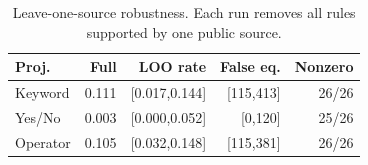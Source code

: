 \begin{table}[H]
\centering
\caption{Leave-one-source robustness. Each run removes all rules supported by one public source.}
\label{tab:source-robustness}
\small
\begin{tabular}{lrrrr}
\toprule
Proj. & Full & LOO rate & False eq. & Nonzero \\
\midrule
Keyword & 0.111 & [0.017,0.144] & [115,413] & 26/26 \\
Yes/No & 0.003 & [0.000,0.052] & [0,120] & 25/26 \\
Operator & 0.105 & [0.032,0.148] & [115,381] & 26/26 \\
\bottomrule
\end{tabular}
\end{table}
